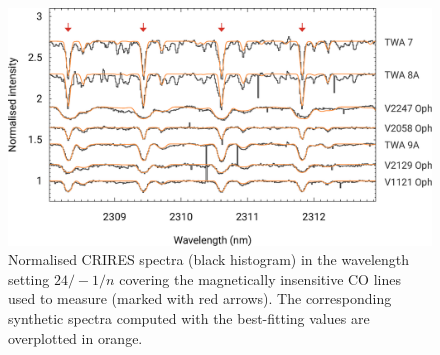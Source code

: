 \documentclass{aa}
\begin{document}
\begin{figure}
\centering
\includegraphics[width=1.6\columnwidth]{tts-vsini.eps}
\caption{
    Normalised CRIRES spectra (black histogram) in the wavelength setting  $24/-1/n$ covering the magnetically insensitive CO lines used to measure {\vsini} (marked with red arrows). The corresponding synthetic spectra computed with the best-fitting {\vsini} values are overplotted in orange.
}
\label{figure:vsini}
\end{figure}

\end{document}
